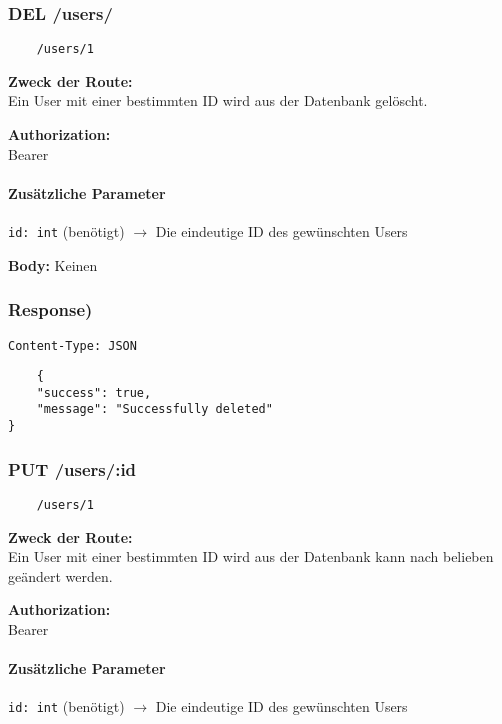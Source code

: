 \pagebreak

\subsubsection{DEL /users/}

\begin{lstlisting}
    /users/1
\end{lstlisting}

\textbf{Zweck der Route:} \\
Ein User mit einer bestimmten ID wird aus der Datenbank gelöscht.

\textbf{Authorization:} \\
Bearer

\paragraph{Zusätzliche Parameter}
\lstinline{id: int} (benötigt)
$\rightarrow$ Die eindeutige ID des gewünschten Users

\textbf{Body:}
Keinen


\subsubsection{Response)}

\lstinline{Content-Type: JSON}
\begin{lstlisting}
    {
    "success": true,
    "message": "Successfully deleted"
}
\end{lstlisting}

\pagebreak


\subsubsection{PUT /users/:id}

\begin{lstlisting}
    /users/1
\end{lstlisting}

\textbf{Zweck der Route:} \\
Ein User mit einer bestimmten ID wird aus der Datenbank kann nach belieben geändert
werden.

\textbf{Authorization:} \\
Bearer

\paragraph{Zusätzliche Parameter}
\lstinline{id: int} (benötigt)
$\rightarrow$ Die eindeutige ID des gewünschten Users

